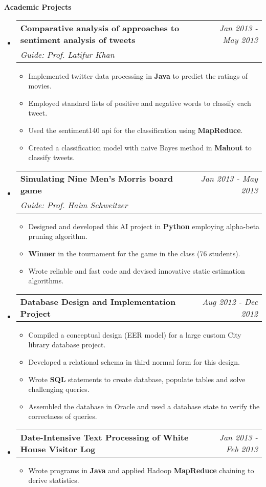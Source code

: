 \documentclass[letterpaper,11pt]{article}
\makeatletter
\newcommand{\resitem}[1]{\item[\ding{226}] #1 \vspace{-2pt}}
\newcommand{\resheading}[1]{{\large \colorbox{mygrey}{\begin{minipage}{\textwidth}{\textbf{#1 \vphantom{p\^{E}}}}\end{minipage}}}}
\newcommand{\ressubheading}[4]{
\begin{tabular*}{7.0in}{l@{\extracolsep{\fill}}r}
		\textbf{#1} & #2 \\
		\textit{#3} & \textit{#4} \\
\end{tabular*}\vspace{-6pt}}
\newcommand{\reslineheading}[2]{
\begin{tabular*}{7.0in}{l@{\extracolsep{\fill}}r}
		\textbf{#1} & #2 \\
\end{tabular*}\vspace{-6pt}}
\makeatother
\begin{document}
\resheading{Academic Projects}
\begin{itemize}

\item
	\ressubheading{Comparative analysis of approaches to sentiment analysis of tweets}{\textit{Jan 2013 - May 2013}}{Guide: Prof. Latifur Khan}{}
	\begin{itemize}
		\resitem{Implemented twitter data processing in \textbf{Java} to predict the ratings of movies.}
		\resitem{Employed standard lists of positive and negative words to classify each tweet.}
		\resitem{Used the sentiment140 api for the classification using \textbf{MapReduce}.}
		\resitem{Created a classification model with naive Bayes method in \textbf{Mahout} to classify tweets.}
	\end{itemize}

\item
	\ressubheading{Simulating Nine Men's Morris board game}{\textit{Jan 2013 - May 2013}}{Guide: Prof. Haim Schweitzer}{}
	\begin{itemize}
		\resitem{Designed and developed this AI project in \textbf{Python} employing alpha-beta pruning algorithm.}
		\resitem{\textbf{Winner} in the tournament for the game in the class (76 students).}
        \resitem{Wrote reliable and fast code and devised innovative static estimation algorithms.}
	\end{itemize}

\item
	\reslineheading{Database Design and Implementation Project}{\textit{Aug 2012 - Dec 2012}}
	\begin{itemize}
		\resitem{Compiled a conceptual design (EER model) for a large custom City library database project.}
		\resitem{Developed a relational schema in third normal form for this design.}
        \resitem{Wrote \textbf{SQL} statements to create database, populate tables and solve challenging queries.}
		\resitem{Assembled the database in Oracle and used a database state to verify the correctness of queries.}
	\end{itemize}

\item
	\reslineheading{Date-Intensive Text Processing of White House Visitor Log}{\textit{Jan 2013 - Feb 2013}}
	\begin{itemize}
		\resitem{Wrote programs in \textbf{Java} and applied Hadoop \textbf{MapReduce} chaining to derive statistics.}%
	\end{itemize}


\end{itemize}
\end{document}
